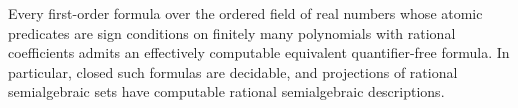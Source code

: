 Every first-order formula over the ordered field of real numbers whose atomic predicates are sign conditions on finitely many polynomials with rational coefficients admits an effectively computable equivalent quantifier-free formula.  In particular, closed such formulas are decidable, and projections of rational semialgebraic sets have computable rational semialgebraic descriptions.